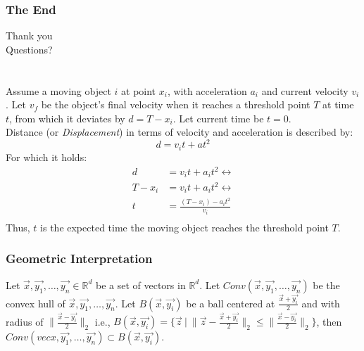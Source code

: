\documentclass[hyperref={pdfpagelabels=false}]{beamer}
\begin{document}
\begin{frame}[plain]\frametitle{The End}
\centering
\Huge
Thank you\\
Questions?
\end{frame}

\section*{  }
\begin{frame}[plain]
Assume a moving object $i$ at point $x_i$, with acceleration $a_i$ and current velocity $v_i$. Let $v_f$ be the object's final velocity when it reaches a threshold point $T$ at time $t$, from which it deviates by $d=T-x_i$. Let current time be $t=0$.\\
Distance (or \emph{Displacement}) in terms of velocity and acceleration is described by:
\begin{equation}
d=v_i t+a t^2
\label{form:displacement}
\end{equation}
For which it holds:
\begin{align*}
d&=v_i t+a_i t^2 \leftrightarrow\\
T-x_i&=v_i t + a_i t^2 \leftrightarrow\\
t&=\frac{(T-x_i)-a_i t^2}{v_i}\\
\end{align*}
Thus, $t$ is the expected time the moving object reaches the threshold point $T$.
\end{frame}


\begin{frame}[plain] \frametitle{Geometric Interpretation}
\begin{theorem}
Let $\vec{x}, \vec{y_1}, \dots, \vec{y_n} \in \mathbb{R}^d$ be a set of vectors in $\mathbb{R}^d$. Let $Conv(\vec{x}, \vec{y_1}, \dots, \vec{y_n})$ be the convex hull of $\vec{x}, \vec{y_1}, \dots, \vec{y_n}$. Let $B(\vec{x}, \vec{y_i})$ be a ball centered at $\frac{\vec{x}+\vec{y_i}}{2}$ and with radius of $\lVert{\frac{\vec{x}-\vec{y_i}}{2}}\rVert_2$ i.e., $B(\vec{x}, \vec{y_i})=\{\vec{z}\ |\ \lVert{\vec{z}-\frac{\vec{x}+\vec{y_i}}{2}}\rVert_2 \leq \lVert{\frac{\vec{x}-\vec{y_i}}{2}}\rVert_2 \}$, then $Conv(vec{x}, \vec{y_1}, \dots, \vec{y_n}) \subset B(\vec{x}, \vec{y_i})$.
\end{theorem}
\end{frame}
\end{document}
